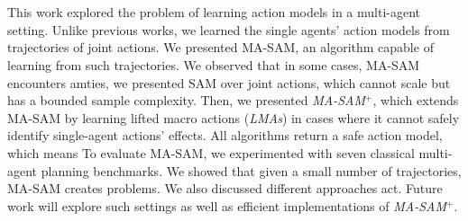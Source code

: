 \documentclass[letterpaper]{article} %
\theoremstyle{definition}
\theoremstyle{remark}
\newcommand{\sam}{\ac{SAM}\xspace}
\newcommand{\masam}{\ac{MA-SAM}\xspace}
\newcommand{\cmasam}{\textit{MA-SAM\ensuremath{^+}}\xspace}
\newcommand{\blmaas}{\textit{LMAs}\xspace}
\begin{document}
\section{}
\label{sec:conclusions}
This work explored the problem of learning action models in a multi-agent setting.
Unlike previous works, we learned the single agents' action models from trajectories of joint actions.
We presented \masam, an algorithm capable of learning from such trajectories. We observed that in some cases, \masam encounters amties, we presented \sam over joint actions, which cannot scale but has a bounded sample complexity.
Then, we presented \cmasam, which extends \masam by learning lifted macro actions (\blmaas) in cases where it cannot safely identify single-agent actions' effects.
All algorithms return a safe action model, which means 
To evaluate \masam, we experimented with seven classical multi-agent planning benchmarks.
We showed that given a small number of trajectories, \masam creates  problems.
We also discussed different approaches act.
Future work will explore such settings as well as efficient implementations of \cmasam. %

\end{document}
